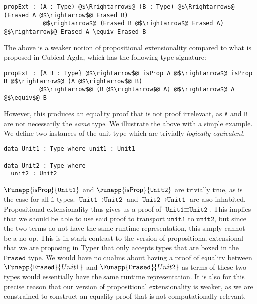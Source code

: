 \documentclass[12pt,twoside,maitrise]{dms}
\theoremstyle{definition}
\numberwithin{equation}{section}
\numberwithin{table}{chapter}
\numberwithin{figure}{chapter}
\newcommand\kw[1] {\textsf{#1}}
\newcommand\id[1] {\texttt{#1}}
\begin{document}
\begin{verbatim}
propExt : (A : Type) @$\Rrightarrow$@ (B : Type) @$\Rrightarrow$@ (Erased A @$\rightarrow$@ Erased B)
           @$\rightarrow$@ (Erased B @$\rightarrow$@ Erased A) @$\rightarrow$@ Erased A \equiv Erased B
\end{verbatim}

The above is a weaker notion of propositional extensionality compared to what is
proposed in Cubical Agda, which has the following type signature:

\begin{verbatim}
propExt : {A B : Type} @$\rightarrow$@ isProp A @$\rightarrow$@ isProp B @$\rightarrow$@ (A @$\rightarrow$@ B)
          @$\rightarrow$@ (B @$\rightarrow$@ A) @$\rightarrow$@ A @$\equiv$@ B
\end{verbatim}

However, this produces an equality proof that is not proof irrelevant, as
$\id{A}$ and $\id{B}$ are not necessarily the \emph{same} type. We illustrate
the above with a simple example. We define two instances of the unit type which
are trivially \emph{logically equivalent}.

\begin{verbatim}
data Unit1 : Type where unit1 : Unit1

data Unit2 : Type where
  unit2 : Unit2
\end{verbatim}

$\Funapp{\kw{isProp}}{\id{Unit1}}$ and $\Funapp{\kw{isProp}}{\id{Unit2}}$ are
trivially true, as is the case for all $\mathbb{1}$-types. $\id{Unit1}
\rightarrow \id{Unit2}$ and $\id{Unit2} \rightarrow \id{Unit1}$ are also
inhabited. Propositional extensionality thus gives us a proof of $\id{Unit1}
\equiv \id{Unit2}$. This implies that we should be able to use said proof to
transport $\id{unit1}$ to $\id{unit2}$, but since the two terms do not have the
same runtime representation, this simply cannot be a no-op. This is in stark
contrast to the version of propositional extensional that we are proposing in
Typer that only accepts types that are boxed in the $\id{Erased}$ type. We would
have no qualms about having a proof of equality between
$\Funapp{\id{Erased}}{Unit1}$ and $\Funapp{\id{Erased}}{Unit2}$ as terms of
these two types would essentially have the same runtime representation. It is
also for this precise reason that our version of propositional extensionality is
weaker, as we are constrained to construct an equality proof that is not
computationally relevant.
\end{document}
